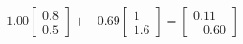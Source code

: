 \documentclass[preview]{standalone}
\begin{document}
\begin{align*}
1.00 \begin{bmatrix} 0.8 \\ 0.5 \end{bmatrix} + -0.69 \begin{bmatrix} 1 \\ 1.6 \end{bmatrix} = \begin{bmatrix} 0.11 \\ -0.60 \end{bmatrix}
\end{align*}
\end{document}

